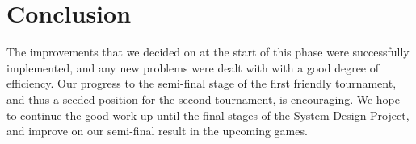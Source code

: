 \documentclass[conference,12pt]{IEEEtran}
\begin{document}
\section{Conclusion}
The improvements that we decided on at the start of this phase were successfully implemented, and any new problems were dealt with with a good degree of efficiency. Our progress to the semi-final stage of the first friendly tournament, and thus a seeded position for the second tournament, is encouraging. We hope to continue the good work up until the final stages of the System Design Project, and improve on our semi-final result in the upcoming games.



\end{document}

